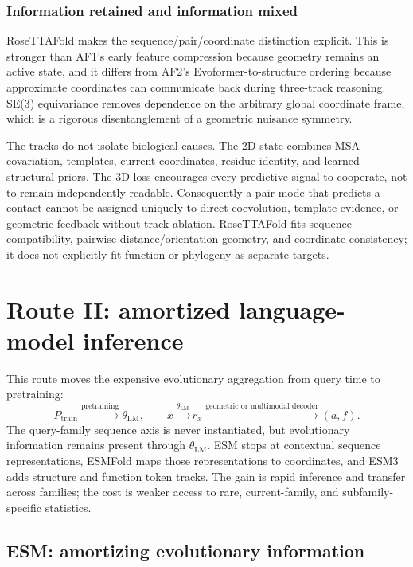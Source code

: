 \documentclass[10pt]{article}
\begin{document}
\subsubsection{Information retained and information mixed}

RoseTTAFold makes the sequence/pair/coordinate distinction explicit.  This is stronger than AF1's
early feature compression because geometry remains an active state, and it differs from AF2's
Evoformer-to-structure ordering because approximate coordinates can communicate back during
three-track reasoning.  SE(3) equivariance removes dependence on the arbitrary global coordinate
frame, which is a rigorous disentanglement of a geometric nuisance symmetry.

The tracks do not isolate biological causes.  The 2D state combines MSA covariation, templates,
current coordinates, residue identity, and learned structural priors.  The 3D loss encourages every
predictive signal to cooperate, not to remain independently readable.  Consequently a pair mode
that predicts a contact cannot be assigned uniquely to direct coevolution, template evidence, or
geometric feedback without track ablation.  RoseTTAFold fits sequence compatibility, pairwise
distance/orientation geometry, and coordinate consistency; it does not explicitly fit function or
phylogeny as separate targets.

\section{Route II: amortized language-model inference}

This route moves the expensive evolutionary aggregation from query time to pretraining:
\begin{equation}
P_{\mathrm{train}}
\xrightarrow{\text{pretraining}}
\theta_{\mathrm{LM}},
\qquad
x\xrightarrow{\theta_{\mathrm{LM}}}
r_x\xrightarrow{\text{geometric or multimodal decoder}}(a,f).
\label{eq:amortized-route}
\end{equation}
The query-family sequence axis is never instantiated, but evolutionary information remains present
through $\theta_{\mathrm{LM}}$.  ESM stops at contextual sequence representations, ESMFold maps
those representations to coordinates, and ESM3 adds structure and function token tracks.  The gain
is rapid inference and transfer across families; the cost is weaker access to rare, current-family,
and subfamily-specific statistics.

\subsection{ESM: amortizing evolutionary information}
\end{document}

